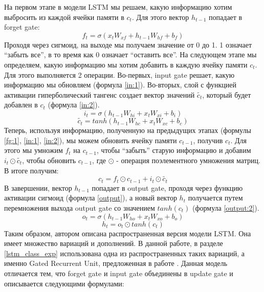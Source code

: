     На первом этапе в модели LSTM мы решаем, какую информацию хотим выбросить из каждой ячейки памяти в $c_{t}$. Для этого вектор $h_{t-1}$ попадает в forget gate:
    \begin{equation}\label{fg:1}
    f_{t} = \sigma(x_{t} W_{xf} + h_{t-1} W_{hf} + b_{f})
    \end{equation}
    Проходя через сигмоид, на выходе мы получаем значение от 0 до 1. 1 означает ``забыть все'', в то время как 0 означает ``оставить все''.
    На следующем этапе мы определяем, какую информацию мы хотим добавить в каждую ячейку памяти $c_{t}$. Для этого выполняется 2 операции. Во-первых, input gate решает, какую информацию мы обновляем (формула \ref{in:1}). Во-вторых, слой с функцией активации гиперболический тангенс создает вектор значений $\tilde{c_{t}}$, который будет добавлен в $c_{t}$ (формула \ref{in:2}).
    \begin{equation}\label{in:1}
    i_{t}=\sigma(h_{t-1} W_{hi} + x_{t} W_{xi} + b_{i})
    \end{equation}
    \begin{equation}\label{in:2}
    \tilde{c_{t}} = tanh(h_{t-1} W_{hc} + x_{t} W_{xc} + b_{c})
    \end{equation}
    Теперь, используя информацию, полученную на предыдущих этапах (формулы \ref{fg:1}, \ref{in:1}, \ref{in:2}), мы можем обновить ячейку памяти $c_{t-1}$, получив $c_{t}$. Для этого мы умножим $f_{t}$ на $c_{t-1}$, чтобы ``забыть'' старую информацию и добавим $i_{t} \odot \tilde{c_{t}}$, чтобы обновить $c_{t-1}$, где $\odot$ - операция поэлементного умножения матриц. В итоге получим:
    \begin{equation}\label{update}
    c_{t}=f_{t} \odot c_{t-1}+i_{t} \odot \tilde{c_{t}}
    \end{equation}
    В завершении, вектор $h_{t-1}$ попадает в output gate, проходя через функцию активации сигмоид (формула \ref{output}), а новый вектор $h_{t}$ получается путем перемножения выхода output gate со значением $tanh(c_{t})$ (формула \ref{output:2}).
    \begin{equation}\label{output}
    o_{t}=\sigma(h_{t-1} W_{ho} + x_{t} W_{xo} + b_{o})
    \end{equation}
    \begin{equation}\label{output:2}
    h_{t}=o_{t} \odot tanh(c_{t})
    \end{equation}
    Таким образом, автором описана распространенная версия модели LSTM. Она имеет множество вариаций и дополнений. В данной работе, в разделе \ref{lstm_class_exp} использована одна из распространенных таких вариаций, а именно Gated Recurrent Unit, предложенная в работе \cite{Cho}. Данная модель отличается тем, что forget gate и input gate объединены в update gate и описывается следующими формулами:
